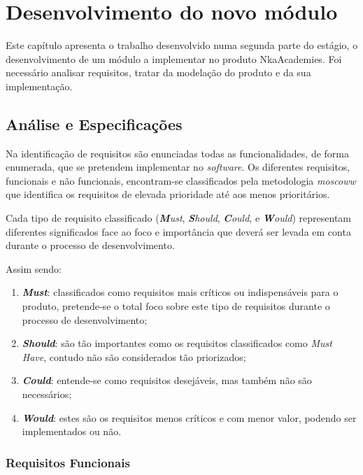 
\chapter{Desenvolvimento do novo módulo}
\label{desenv}
Este capítulo apresenta o trabalho desenvolvido numa segunda parte do estágio, o desenvolvimento de um módulo a implementar no produto NkaAcademies. Foi necessário analisar requisitos, tratar da modelação do produto e da sua implementação.

\section{Análise e Especificações}

Na identificação de requisitos são enunciadas todas as funcionalidades, de forma enumerada, que se pretendem implementar no \textit{software}.
Os diferentes requisitos, funcionais e não funcionais, encontram-se classificados pela metodologia \textit{\gls{moscoww}} que identifica os requisitos de elevada prioridade até aos menos prioritários.

Cada tipo de requisito classificado (\textit{\textbf{M}ust}, \textit{\textbf{S}hould}, \textit{\textbf{C}ould}, e \textit{\textbf{W}ould}) representam diferentes significados face ao foco e importância que deverá ser levada em conta durante o processo de desenvolvimento.

Assim sendo:


\begin{enumerate}
  \item \textbf{\textit{Must}}: classificados como requisitos mais críticos ou indispensáveis para o produto, pretende-se o total foco sobre este tipo de requisitos durante o processo de desenvolvimento;
  \item \textbf{\textit{Should}}: são tão importantes como os requisitos classificados como \textit{Must Have}, contudo não são considerados tão priorizados;
  \item \textbf{\textit{Could}}: entende-se como requisitos desejáveis, mas também não são necessários;
  \item \textbf{\textit{Would}}: estes são os requisitos menos críticos e com menor valor, podendo ser implementados ou não.
\end{enumerate}

\subsection{Requisitos Funcionais}


